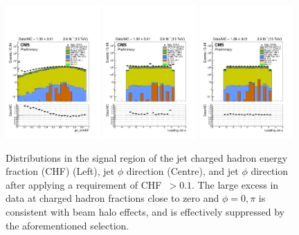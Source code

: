 \begin{figure}[h!]
    \begin{center}
        {\includegraphics[width=0.32\textwidth]{figures/selection/jet_chHEF_mono_all_before.pdf}}
        {\includegraphics[width=0.32\textwidth]{figures/selection/jet_phi[0]_mono_all_before.pdf}}
        {\includegraphics[width=0.32\textwidth]{figures/selection/jet_phi[0]_mono_all_after.pdf}}
        \caption{Distributions in the signal region of the jet charged
          hadron energy fraction (CHF) (Left), jet $\phi$ direction
          (Centre), and jet $\phi$ direction after applying a
          requirement of {CHF~$>0.1$}. The large excess in data at
          charged hadron fractions close to zero and ${\phi = 0, \pi}$
          is consistent with beam halo effects, and is effectively
          suppressed by the aforementioned selection.}
        \label{fig:leadJetCleaning}
    \end{center}
\end{figure}

